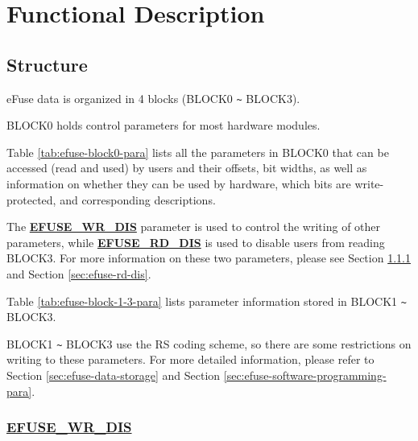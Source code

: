 \documentclass[main\_\_EN.tex]{subfiles}
\begin{document}
\section{Functional Description}

\subsection{Structure}

eFuse data is organized in 4 blocks (BLOCK0 \verb+~+ BLOCK3).

BLOCK0 holds control parameters for most hardware modules.

Table \ref{tab:efuse-block0-para} lists all the parameters in BLOCK0 that can be accessed (read and used) by users and their offsets, bit widths, as well as information on whether they can be used by hardware, which bits are write-protected, and corresponding descriptions.

The {\bfseries \hyperref[fielddesc:EFUSEWRDIS]{EFUSE\_WR\_DIS}} parameter is used to control the writing of other parameters, while {\bfseries \hyperref[fielddesc:EFUSERDDIS]{EFUSE\_RD\_DIS}} is used to disable users from reading BLOCK3. For more information on these two parameters, please see Section \ref{sec:efuse-wr-dis} and Section \ref{sec:efuse-rd-dis}.

\clearpage
\begin{landscape}



\end{landscape}
\restoregeometry
\clearpage

\clearpage
\begin{landscape}

Table \ref{tab:efuse-block-1-3-para} lists parameter information stored in BLOCK1 \verb+~+ BLOCK3.





BLOCK1 \verb+~+ BLOCK3 use the RS coding scheme, so there are some restrictions on writing to these parameters. For more detailed information, please refer to Section \ref{sec:efuse-data-storage} and Section \ref{sec:efuse-software-programming-para}.

\end{landscape}
\restoregeometry
\clearpage

\subsubsection{\hyperref[fielddesc:EFUSEWRDIS]{EFUSE\_WR\_DIS}}
\label{sec:efuse-wr-dis}
\end{document}

